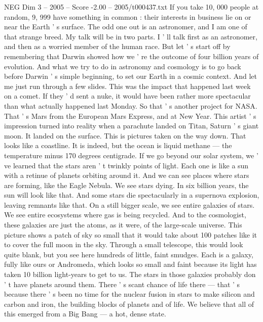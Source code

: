 \begin{textsample}{NEG Dim 3 – 2005 – Score -2.00 – 2005/t000437.txt}  \label{ex:f3_neg_036}
If you take 10, 000 people at random, 9, 999 have something in common : their interests in business lie on or near the Earth ' s surface.
The odd one out is an astronomer, and I am one of that strange breed.
My talk will be in two parts.
I ' ll talk first as an astronomer, and then as a worried member of the human race.
But let ' s start off by remembering that Darwin showed how we ' re the outcome of four billion years of evolution.
And what we try to do in astronomy and cosmology is to go back before Darwin ' s simple beginning, to set our Earth in a cosmic context.
And let me just run through a few slides.
This was the impact that happened last week on a comet.
If they ' d sent a nuke, it would have been rather more spectacular than what actually happened last Monday.
So that ' s another project for NASA.
That ' s Mars from the European Mars Express, and at New Year.
This artist ' s impression turned into reality when a parachute landed on Titan, Saturn ' s giant moon.
It landed on the surface.
This is pictures taken on the way down.
That looks like a coastline.
It is indeed, but the ocean is liquid methane — the temperature minus 170 degrees centigrade.
If we go beyond our solar system, we ' ve learned that the stars aren ' t twinkly points of light.
Each one is like a sun with a retinue of planets orbiting around it.
And we can see places where stars are forming, like the Eagle Nebula.
We see stars dying.
In six billion years, the sun will look like that.
And some stars die spectacularly in a supernova explosion, leaving remnants like that.
On a still bigger scale, we see entire galaxies of stars.
We see entire ecosystems where gas is being recycled.
And to the cosmologist, these galaxies are just the atoms, as it were, of the large-scale universe.
This picture shows a patch of sky so small that it would take about 100 patches like it to cover the full moon in the sky.
Through a small telescope, this would look quite blank, but you see here hundreds of little, faint smudges.
Each is a galaxy, fully like ours or Andromeda, which looks so small and faint because its light has taken 10 billion light-years to get to us.
The stars in those galaxies probably don ' t have planets around them.
There ' s scant chance of life there — that ' s because there ' s been no time for the nuclear fusion in stars to make silicon and carbon and iron, the building blocks of planets and of life.
We believe that all of this emerged from a Big Bang — a hot, dense state.

\end{textsample}
